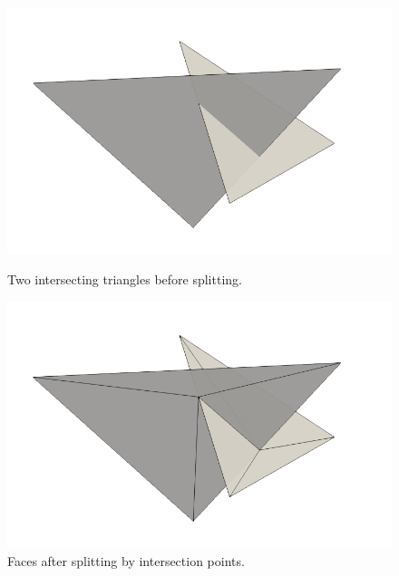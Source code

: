 \documentclass[
11pt,%
tightenlines,%
twoside,%
onecolumn,%
nofloats,%
nobibnotes,%
nofootinbib,%
superscriptaddress,%
noshowpacs,%
centertags]%
{revtex4-2}
\begin{document}
\begin{figure}[h]
  \centering
  \begin{minipage}[h]{0.38\textwidth}
    \includegraphics[width=\textwidth]{pics/pic_before_cut.png}
    \caption{Two intersecting triangles before splitting.}\label{fig:pic_before_cut}
  \end{minipage}
  \begin{minipage}[h]{0.38\textwidth}
    \includegraphics[width=\textwidth]{pics/pic_after_cut.png}
    \caption{Faces after splitting by intersection points.}\label{fig:pic_after_cut}
  \end{minipage}
\end{figure}
\end{document}
